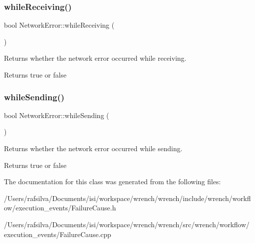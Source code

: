\subsubsection{\texorpdfstring{while\+Receiving()}{whileReceiving()}}
{\footnotesize\ttfamily bool Network\+Error\+::while\+Receiving (\begin{DoxyParamCaption}{ }\end{DoxyParamCaption})}



Returns whether the network error occurred while receiving. 

\begin{DoxyReturn}{Returns}
true or false 
\end{DoxyReturn}
\mbox{\label{class_network_error_a61212c18b0427f96c1bc9e0137d0516e}} 
\subsubsection{\texorpdfstring{while\+Sending()}{whileSending()}}
{\footnotesize\ttfamily bool Network\+Error\+::while\+Sending (\begin{DoxyParamCaption}{ }\end{DoxyParamCaption})}



Returns whether the network error occurred while sending. 

\begin{DoxyReturn}{Returns}
true or false 
\end{DoxyReturn}


The documentation for this class was generated from the following files\+:\begin{DoxyCompactItemize}
\item 
/\+Users/rafsilva/\+Documents/isi/workspace/wrench/wrench/include/wrench/workflow/execution\+\_\+events/Failure\+Cause.\+h\item 
/\+Users/rafsilva/\+Documents/isi/workspace/wrench/wrench/src/wrench/workflow/execution\+\_\+events/Failure\+Cause.\+cpp\end{DoxyCompactItemize}
